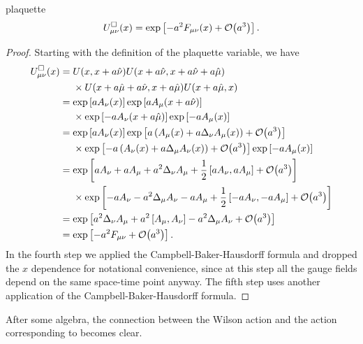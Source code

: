 \begin{proposition}{}{plaquette}
$$
U^\Box_{\mu\nu}(x)=\exp\left[-a^2F_{\mu\nu}(x)+\order{a^3}\right].
$$
  \begin{proof}
    Starting with the definition of the plaquette variable, we have
    \begin{equation*}\begin{aligned}
      U^\Box_{\mu\nu}(x)&=U(x,x+a\hat\nu)U(x+a\hat\nu,x+a\hat\nu+a\hat\mu)\\
               &~~~~\times U(x+a\hat\mu+a\hat\nu,x+a\hat\mu)U(x+a\hat\mu,x)\\
            &=\exp\left[aA_\nu(x)\right]
              \exp\left[aA_\mu(x+a\hat\nu)\right]\\
               &~~~~\times\exp\left[-aA_\nu(x+a\hat\mu)\right]
                \exp\left[-aA_\mu(x)\right]\\
            &=\exp\left[aA_\nu(x)\right]
               \exp\left[a\left( A_\mu(x)+a\Delta_\nu A_\mu(x) \right)
                                 +\order{a^3}\right]\\
               &~~~~\times
               \exp\left[-a\left(A_\nu(x)+a\Delta_\mu A_\nu(x) \right)
                                 +\order{a^3}\right]
               \exp\left[-aA_\mu(x)\right]\\
            &=\exp\left[aA_\nu+aA_\mu+a^2\Delta_\nu A_\mu
                 +\frac{1}{2}\left[aA_\nu,aA_\mu\right]
                 +\order{a^3}\right]\\
            &~~~~\times\exp\left[-aA_\nu-a^2\Delta_\mu A_\nu-aA_\mu
                 +\frac{1}{2}\left[-aA_\nu,-aA_\mu\right]
                 +\order{a^3}\right]\\
            &=\exp\left[a^2\Delta_\nu A_\mu+a^2\left[A_\mu,A_\nu\right]
                 -a^2\Delta_\mu A_\nu+\order{a^3}\right]\\
            &=\exp\left[-a^2F_{\mu\nu}+\order{a^3}\right].
    \end{aligned}\end{equation*}
    In the fourth step we applied the Campbell-Baker-Hausdorff formula and
    dropped the $x$ dependence for notational convenience, since at this
    step all the gauge fields depend on the same space-time point anyway.
    The fifth step uses another application of the Campbell-Baker-Hausdorff
    formula.
  \end{proof}
\end{proposition}
After some algebra, the connection between the Wilson action and the action
corresponding to  becomes clear.
